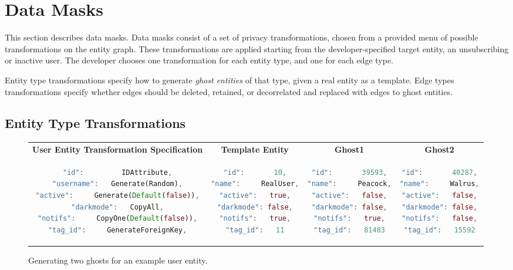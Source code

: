 \section{Data Masks}
\label{sec:policies}

This section describes data masks. Data masks consist of a set of privacy transformations, chosen
from a provided menu of possible transformations on the entity graph. These transformations are
applied starting from the developer-specified target entity, \eg an unsubscribing or inactive user.
The developer chooses one transformation for each entity type, and one for each edge type.

Entity type transformations specify how to generate \emph{ghost entities} of that type, given a real
entity as a  template.  Edge types transformations specify whether edges should be deleted,
retained, or decorrelated and replaced with edges to ghost entities.

\subsection{Entity Type Transformations}
\label{sec:ghosting}

\begin{figure}[t!]
    \centering
    \footnotesize
\begin{tabular}{@{}c|c|c|c@{}}
\textbf{User Entity Transformation Specification} & \textbf{Template Entity} & \textbf{Ghost1} &
    \textbf{Ghost2} \\
\begin{lstlisting}[language=Rust]
"id":         IDAttribute,
"username":   Generate(Random),
"active":     Generate(Default(false)),
"darkmode":   CopyAll,
"notifs":     CopyOne(Default(false)),
"tag_id":     GenerateForeignKey,
\end{lstlisting}
    & 
\begin{lstlisting}[language=Rust]
"id":       10,
"name":     RealUser,
"active":   true,
"darkmode": false,
"notifs":   true,
"tag_id":   11
\end{lstlisting}
& 
\begin{lstlisting}[language=Rust]
"id":       39593,
"name":     Peacock,
"active":   false,
"darkmode": false,
"notifs":   true,
"tag_id":   81483
\end{lstlisting}
&
\begin{lstlisting}[language=Rust]
"id":       40287,
"name":     Walrus,
"active":   false,
"darkmode": false,
"notifs":   false,
"tag_id":   15592
\end{lstlisting}
\end{tabular}
    \caption{Generating two ghosts for an example user entity.} 
    \label{fig:ghosting}
\end{figure}


